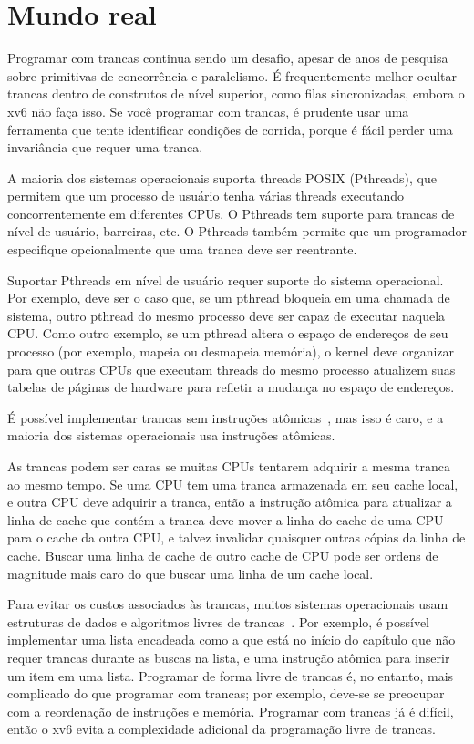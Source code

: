 \section{Mundo real}

Programar com trancas continua sendo um desafio, apesar de anos de pesquisa
sobre primitivas de concorrência e paralelismo.
É frequentemente melhor ocultar trancas dentro de
construtos de nível superior, como filas sincronizadas, embora o xv6 não
faça isso. Se você programar com trancas, é prudente usar uma ferramenta que tente
identificar condições de corrida, porque é fácil perder uma invariância que requer
uma tranca.

A maioria dos sistemas operacionais suporta threads POSIX (Pthreads), que permitem que um
processo de usuário tenha várias threads executando concorrentemente em diferentes
CPUs. O Pthreads tem suporte para trancas de nível de usuário, barreiras, etc.
O Pthreads também permite que um programador especifique opcionalmente que uma tranca
deve ser reentrante.

Suportar Pthreads em nível de usuário requer suporte do sistema
operacional. Por exemplo, deve ser o caso que, se um pthread bloqueia
em uma chamada de sistema, outro pthread do mesmo processo deve ser capaz
de executar naquela CPU. Como outro exemplo, se um pthread altera o
espaço de endereços de seu processo (por exemplo, mapeia ou desmapeia memória), o kernel deve
organizar para que outras CPUs que executam threads do mesmo processo atualizem
suas tabelas de páginas de hardware para refletir a mudança no espaço de endereços.

É possível implementar trancas sem instruções atômicas~\cite{lamport:bakery}, mas isso é caro, e a maioria
dos sistemas operacionais usa instruções atômicas.

As trancas podem ser caras se muitas CPUs tentarem adquirir a mesma tranca
ao mesmo tempo. Se uma CPU tem uma tranca
armazenada em seu cache local, e outra CPU deve adquirir a tranca, então a
instrução atômica para atualizar a linha de cache que contém a tranca deve mover a linha
do cache de uma CPU para o cache da outra CPU, e talvez
invalidar quaisquer outras cópias da linha de cache. Buscar uma linha de cache de
outro cache de CPU pode ser ordens de magnitude mais caro do que
buscar uma linha de um cache local.

Para evitar os custos associados às trancas, muitos sistemas operacionais
usam estruturas de dados e algoritmos livres de trancas~\cite{herlihy:art,mckenney:rcuusage}.
Por exemplo, é possível implementar uma lista encadeada como a que está no
início do capítulo que não requer trancas durante as
buscas na lista, e uma instrução atômica para inserir um item em uma lista.
Programar de forma livre de trancas é, no entanto, mais complicado do que programar
com trancas; por exemplo, deve-se se preocupar com a reordenação de instruções e memória.
Programar com trancas já é difícil, então o xv6 evita a
complexidade adicional da programação livre de trancas.

